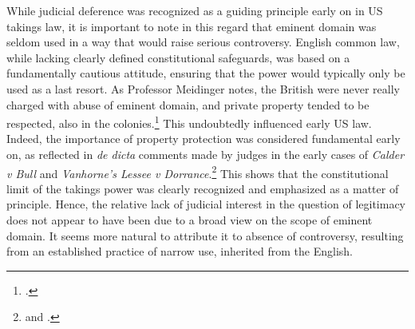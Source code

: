 While judicial deference was recognized as a guiding principle early on in US takings law, it is important to note in this regard that eminent domain was seldom used in a way that would raise serious controversy. English common law, while lacking clearly defined constitutional safeguards, was based on a fundamentally cautious attitude, ensuring that the power would typically only be used as a last resort. As Professor Meidinger notes, the British were never really charged with abuse of eminent domain, and private property tended to be respected, also in the colonies.\footcite[17]{meidinger80} This undoubtedly influenced early US law. Indeed, the importance of property protection was considered fundamental early on, as reflected in {\it de dicta} comments made by judges in the early cases of {\it Calder v Bull} and {\it Vanhorne’s Lessee v Dorrance}.\footnote{\cite[388]{calder98} and \cite[310]{vanhorne95}.} This shows that the constitutional limit of the takings power was clearly recognized and emphasized as a matter of principle. Hence, the relative lack of judicial interest in the question of legitimacy does not appear to have been due to a broad view on the scope of eminent domain. It seems more natural to attribute it to absence of controversy, resulting from an established practice of narrow use, inherited from the English.
